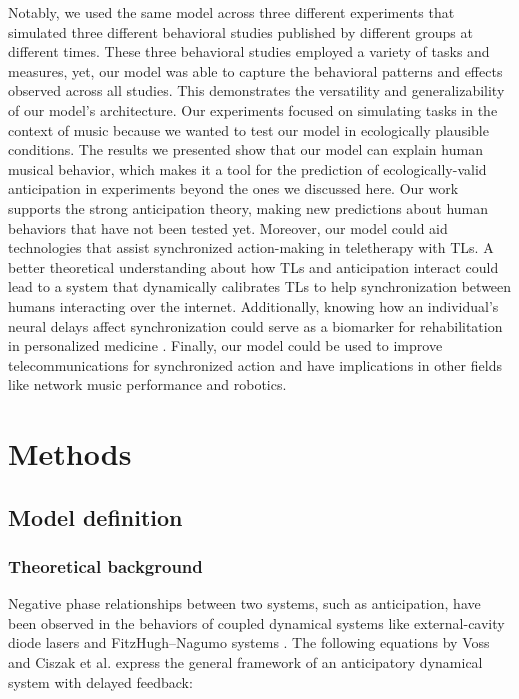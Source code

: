 \documentclass{report}
\begin{document}
Notably, we used the same model across three different experiments that simulated three different behavioral studies published by different groups at different times. These three behavioral studies employed a variety of tasks and measures, yet, our model was able to capture the behavioral patterns and effects observed across all studies. This demonstrates the versatility and generalizability of our model’s architecture. Our experiments focused on simulating tasks in the context of music because we wanted to test our model in ecologically plausible conditions. The results we presented show that our model can explain human musical behavior, which makes it a tool for the prediction of ecologically-valid anticipation in experiments beyond the ones we discussed here. Our work supports the strong anticipation theory, making new predictions about human behaviors that have not been tested yet. Moreover, our model could aid technologies that assist synchronized action-making in teletherapy with TLs. A better theoretical understanding about how TLs and anticipation interact could lead to a system that dynamically calibrates TLs to help synchronization between humans interacting over the internet. Additionally, knowing how an individual’s neural delays affect synchronization could serve as a biomarker for rehabilitation in personalized medicine \cite{slowinski2016dynamic, slowinski2017unravelling}. Finally, our model could be used to improve telecommunications for synchronized action and have implications in other fields like network music performance and robotics.

\section{Methods}

\subsection{Model definition}

\subsubsection{Theoretical background}

Negative phase relationships between two systems, such as anticipation, have been observed in the behaviors of coupled dynamical systems like external-cavity diode lasers \cite{ikeda1980optical} and FitzHugh–Nagumo systems \cite{toral2003characterization}. The following equations by Voss \cite{voss2000anticipating, boccaletti2001space} and Ciszak et al. \cite{ciszak2004dynamical} express the general framework of an anticipatory dynamical system with delayed feedback: 
\end{document}
